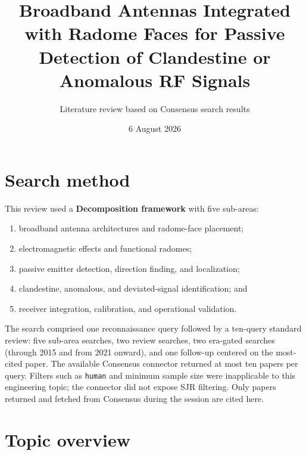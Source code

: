 \documentclass[
  10pt,
]{article}
\title{Broadband Antennas Integrated with Radome Faces for Passive
Detection of Clandestine or Anomalous RF Signals}
\author{Literature review based on Consensus search results}
\date{6 August 2026}
\providecommand{\tightlist}{%
  \setlength{\itemsep}{0pt}\setlength{\parskip}{0pt}}
\begin{document}
\maketitle

{
\setcounter{tocdepth}{3}
\tableofcontents
}
\section{Search method}\label{search-method}

This review used a \textbf{Decomposition framework} with five sub-areas:

\begin{enumerate}
\def\labelenumi{\arabic{enumi}.}
\tightlist
\item
  broadband antenna architectures and radome-face placement;
\item
  electromagnetic effects and functional radomes;
\item
  passive emitter detection, direction finding, and localization;
\item
  clandestine, anomalous, and deviated-signal identification; and
\item
  receiver integration, calibration, and operational validation.
\end{enumerate}

The search comprised one reconnaissance query followed by a ten-query
standard review: five sub-area searches, two review searches, two
era-gated searches (through 2015 and from 2021 onward), and one
follow-up centered on the most-cited paper. The available Consensus
connector returned at most ten papers per query. Filters such as
\texttt{human} and minimum sample size were inapplicable to this
engineering topic; the connector did not expose SJR filtering. Only
papers returned and fetched from Consensus during the session are cited
here.

\section{Topic overview}\label{topic-overview}
\end{document}
